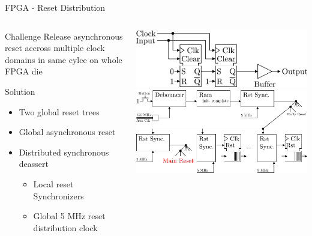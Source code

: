 \documentclass[10pt]{beamer}
\begin{document}
\begin{frame}{FPGA - Reset Distribution}
  \begin{columns}[T]
    \begin{column}{.4\textwidth}
      \begin{block}{Challenge}
        Release asynchronous reset accross multiple
        clock domains in same cylce on whole FPGA die
      \end{block}

      \begin{block}{Solution}
        \begin{itemize}
        \item Two global reset trees
        \item Global asynchronous reset
        \item Distributed synchronous deassert
          \begin{itemize}
          \item Local reset Synchronizers
          \item Global 5 MHz reset distribution clock
          \end{itemize}
        \end{itemize}
      \end{block}
    \end{column}
    \begin{column}{.6\textwidth}
      \vspace{6mm}
      \includegraphics[width=\textwidth]{figures/RstSync} \\
      \vspace{10mm}
      \includegraphics[width=\textwidth]{figures/rst_generation}
    \end{column}
  \end{columns}
\end{frame}
\end{document}
